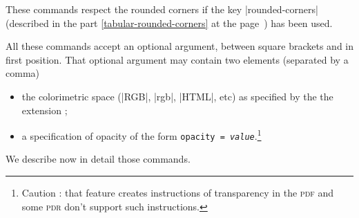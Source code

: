 \documentclass[dvipsnames]{article}%
\begin{document}
\medskip
These commands respect the rounded corners if the key |rounded-corners|
(described in the part \ref{tabular-rounded-corners} at the
page~\pageref{tabular-rounded-corners}) has been used.

\medskip
All these commands accept an optional argument, between square brackets and
in first position. That optional argument may contain two elements (separated
by a comma)
\begin{itemize}
\item the colorimetric space (|RGB|, |rgb|, |HTML|, etc) as specified by the
the extension ;
\item {}
a specification of opacity of the form \texttt{opacity =
  \textsl{value}}.\footnote{Caution : that feature creates instructions of
  transparency in the \textsc{pdf} and some \textsc{pdr} don't support such instructions.}
\end{itemize}

\bigskip

We describe now in detail those commands.
\end{document}
